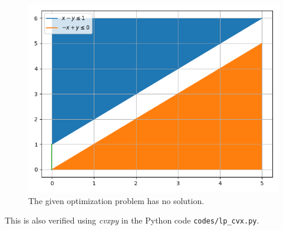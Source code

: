 \documentclass[journal,12pt,twocolumn]{IEEEtran}
\begin{document}
\begin{enumerate}
\begin{figure}[!ht]
        \includegraphics[width=\columnwidth]{figs/lp.png}
        \caption{The given optimization problem has no solution.}
        \label{fig:lp}
    \end{figure}
    This is also verified using \textit{cvxpy} in the Python code \texttt{codes/lp\_cvx.py}.
\end{enumerate}
\end{document}
